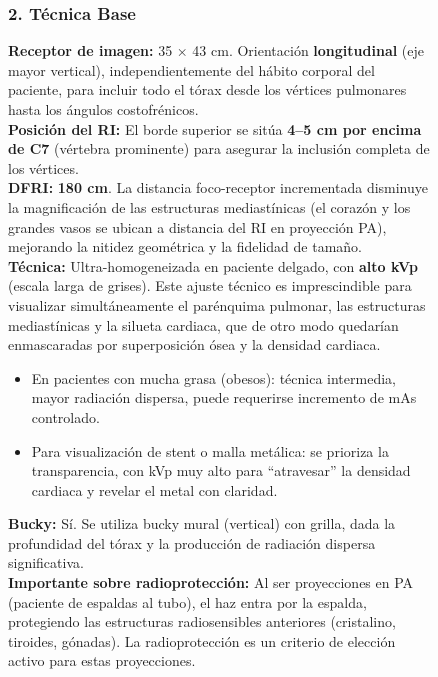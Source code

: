 \begin{figure}
{%
\subsubsection*{2. Técnica Base}

\textbf{Receptor de imagen:} 35 × 43 cm. Orientación \textbf{longitudinal} (eje mayor vertical),
independientemente del hábito corporal del paciente, para incluir todo el tórax desde los vértices
pulmonares hasta los ángulos costofrénicos.\\

\textbf{Posición del RI:} El borde superior se sitúa \textbf{4--5 cm por encima de C7} (vértebra
prominente) para asegurar la inclusión completa de los vértices.\\

\textbf{DFRI:} \textbf{180 cm}. La distancia foco-receptor incrementada disminuye la magnificación
de las estructuras mediastínicas (el corazón y los grandes vasos se ubican a distancia del RI en
proyección PA), mejorando la nitidez geométrica y la fidelidad de tamaño.\\

\textbf{Técnica:} Ultra-homogeneizada en paciente delgado, con \textbf{alto kVp} (escala larga de
grises). Este ajuste técnico es imprescindible para visualizar simultáneamente el parénquima
pulmonar, las estructuras mediastínicas y la silueta cardiaca, que de otro modo quedarían
enmascaradas por superposición ósea y la densidad cardiaca.

\begin{itemize}
  \item En pacientes con mucha grasa (obesos): técnica intermedia, mayor radiación dispersa,
        puede requerirse incremento de mAs controlado.
  \item Para visualización de stent o malla metálica: se prioriza la transparencia, con kVp
        muy alto para ``atravesar'' la densidad cardiaca y revelar el metal con claridad.
\end{itemize}

\textbf{Bucky:} Sí. Se utiliza bucky mural (vertical) con grilla, dada la profundidad del tórax y
la producción de radiación dispersa significativa.\\

\textbf{Importante sobre radioprotección:} Al ser proyecciones en PA (paciente de espaldas al tubo),
el haz entra por la espalda, protegiendo las estructuras radiosensibles anteriores
(cristalino, tiroides, gónadas). La radioprotección es un criterio de elección activo para estas
proyecciones.

}
\end{figure}
